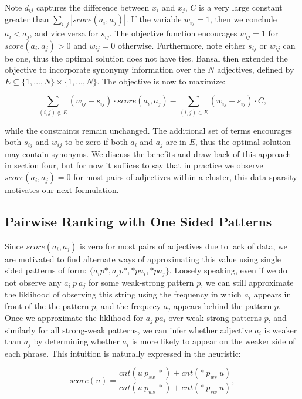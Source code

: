 Note $d_{ij}$ captures the difference between $x_i$ and $x_j$, $C$ is a very large constant greater than $\sum_{i,j} |score(a_i,a_j)|$. If the variable $w_{ij} = 1$, then we conclude $a_i < a_j$, and vice versa for $s_{ij}$. The objective function encourages $w_{ij} = 1$  for $score(a_i,a_j) > 0$ and $w_{ij} = 0$ otherwise. Furthermore, note either $s_{ij}$ or $w_{ij}$ can be one, thus the optimal solution does not have ties. Bansal then extended the objective to incorporate synonymy information over the $N$ adjectives, defined by $E \subseteq \{1,...,N\} \times \{1,...,N\}$. The objective is now to maximize:

\[ \sum_{(i,j) \not\in E} (w_{ij} - s_{ij}) \cdot score(a_i, a_j) - \sum_{(i,j) \in E} (w_{ij} + s_{ij}) \cdot C,\]

while the constraints remain unchanged. The additional set of terms encourages both $s_{ij}$ and $w_{ij}$ to be zero if both $a_i$ and $a_j$ are in $E$, thus the optimal solution may contain synonyms. We discuss the benefits and draw back of this approach in section four, but for now it suffices to say that in practice we observe $score(a_i, a_j) = 0$ for most pairs of adjectives within a cluster, this data sparsity motivates our next formulation.

\subsection{Pairwise Ranking with One Sided Patterns}

Since $score(a_i, a_j)$ is zero for most pairs of adjectives due to lack of data, we are motivated to find alternate ways of approximating this value using single sided patterns of form: $\{a_i p *, a_j p *, * p a_i, * p a_j\}$. Loosely speaking, even if we do not observe any $a_i \: p \: a_j$ for some weak-strong pattern $p$, we can still approximate the liklihood of observing this string using the frequency in which $a_i$ appears in front of the the pattern $p$, and the frequecy $a_j$ appears behind the pattern $p$. Once we approximate the liklihood for $a_j \: p a_i$ over weak-strong patterns $p$, and similarly for all strong-weak patterns, we can infer whether adjective $a_i$ is weaker than $a_j$ by determining whether $a_i$ is more likely to appear on the weaker side of each phrase. This intuition is naturally expressed in the heuristic:

\[
  score(u) = \frac{ cnt(u \: p_{sw} \: *) + cnt(* \: p_{ws} \: u)  }
                  { cnt(u \: p_{ws} \: *) + cnt(* \: p_{sw} \: u) },
\]

